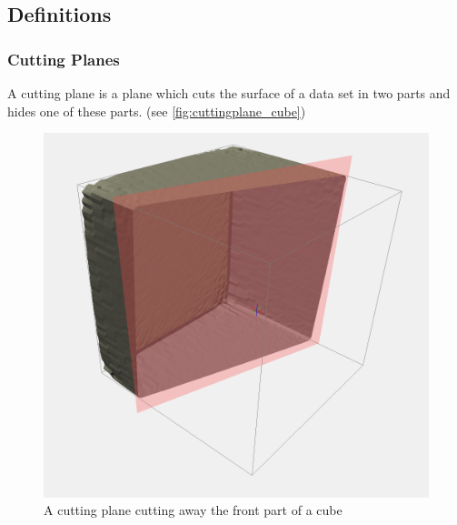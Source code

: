 \subsection{Definitions}
\subsubsection*{Cutting Planes}\label{sec:def_cuttingplane}
A cutting plane is a plane which cuts the surface of a data set in two parts and hides one of these parts. (see \autoref{fig:cuttingplane_cube})

\begin{figure}[h!]
  \centering
  \includegraphics[width=1.0\textwidth]{img/cuttingplane_cube.png}
  \caption{A cutting plane cutting away the front part of a cube}
  \label{fig:cuttingplane_cube}
\end{figure}
